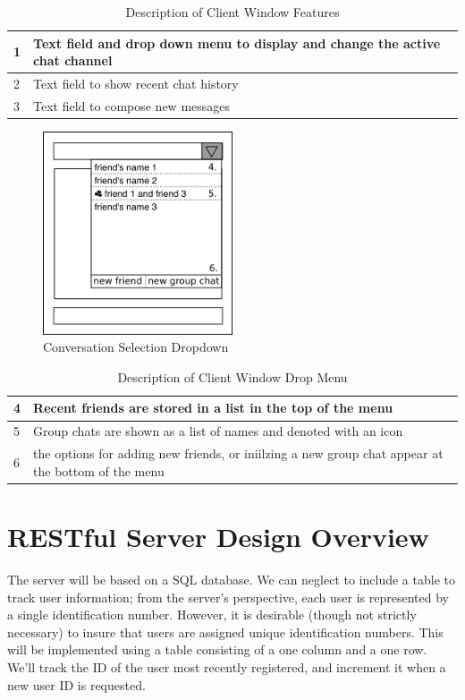 \documentclass[12pt]{article}
\begin{document}
\begin{table}[htpb]
	\centering
	\caption{Description of Client Window Features}
	\label{tab:client_window_feat}
	\begin{tabular}{|l|p{8cm}|}
	\hline
		1 & Text field and drop down menu to display and change the active chat
		channel\\
	\hline
		2 & Text field to show recent chat history\\
	\hline
		3 & Text field to compose new messages\\
	\hline
	\end{tabular}
\end{table}

\begin{figure}[htpb]    
\label{fig:client_dropdown}
\caption{Conversation Selection Dropdown}
\centering
\includegraphics[width=0.5\textwidth]{client_dropdown}
\end{figure}

\begin{table}[htpb]
	\centering
	\caption{Description of Client Window Drop Menu}
	\label{tab:client_dropdown_feat}
	\begin{tabular}{|l|p{8cm}|}
	\hline
		4 & Recent friends are stored in a list in the top of the menu\\
	\hline
		5 & Group chats are shown as a list of names and denoted with an icon\\
	\hline
		6 & the options for adding new friends, or iniilzing a new group chat
		appear at the bottom of the menu\\
	\hline
	\end{tabular}
\end{table}

\section{RESTful Server Design Overview}
The server will be based on a SQL database.  We can neglect to include a table
to track user information; from the server's perspective, each user is
represented by a single identification number.  However, it is desirable
(though not strictly necessary) to insure that users are assigned unique
identification numbers.  This will be implemented using a table consisting of a
one column and a one row.  We'll track the ID of the user most recently
registered, and increment it when a new user ID is requested.
\end{document}
